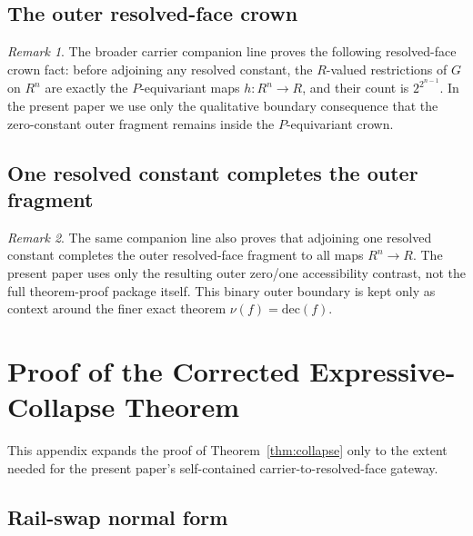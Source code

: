 \documentclass[11pt]{article}
\theoremstyle{remark}
\newtheorem*{remark}{Remark}
\newcommand{\dec}{\ensuremath{\mathrm{dec}}}
\begin{document}
\subsection{The outer resolved-face crown}

\begin{remark}
The broader carrier companion line proves the following resolved-face crown
fact: before adjoining any resolved constant, the $R$-valued restrictions
of $G$ on $R^n$ are exactly the $P$-equivariant maps $h:R^n\to R$, and
their count is $2^{2^{n-1}}$. In the present paper we use only the
qualitative boundary consequence that the zero-constant outer fragment
remains inside the $P$-equivariant crown.
\end{remark}

\subsection{One resolved constant completes the outer fragment}

\begin{remark}
The same companion line also proves that adjoining one resolved constant
completes the outer resolved-face fragment to all maps $R^n\to R$. The
present paper uses only the resulting outer zero/one accessibility
contrast, not the full theorem-proof package itself. This binary outer
boundary is kept only as context around the finer exact theorem
$\nu(f)=\dec(f)$.
\end{remark}

\section{Proof of the Corrected Expressive-Collapse Theorem}

This appendix expands the proof of Theorem~\ref{thm:collapse} only to the
extent needed for the present paper's self-contained
carrier-to-resolved-face gateway.

\subsection{Rail-swap normal form}
\end{document}
